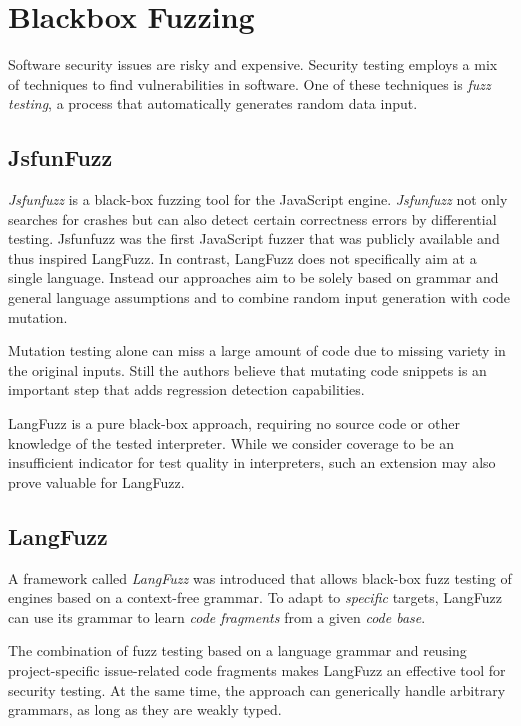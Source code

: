 \section{Blackbox Fuzzing\cite{holler2012fuzzing}} 
Software security issues are risky and expensive. 
Security testing employs a mix of techniques to find vulnerabilities in software. 
One of these techniques is \textit{fuzz testing}, a process that automatically generates random data input.

\subsection{JsfunFuzz}

\textit{Jsfunfuzz} is a black-box fuzzing tool for the JavaScript engine. \textit{Jsfunfuzz} not only searches for crashes but can also detect certain correctness errors by differential testing.
Jsfunfuzz was the first JavaScript fuzzer that was publicly available and thus inspired LangFuzz. In contrast, LangFuzz does not specifically aim at a single language.
Instead our approaches aim to be solely based on grammar and general language assumptions and to combine random input generation with code mutation.

Mutation testing alone can miss a large amount of code due to missing variety in the original inputs.
Still the authors believe that mutating code snippets is an important step that adds regression detection capabilities.

LangFuzz is a pure black-box approach, requiring no source code or other knowledge of the tested interpreter.
While we consider coverage to be an insufficient indicator for test quality in interpreters, such an extension may also prove valuable for LangFuzz.

\subsection{LangFuzz}

A framework called \textit{LangFuzz} was introduced that allows black-box fuzz testing of engines based on a context-free grammar.
To adapt to \textit{specific} targets, LangFuzz can use its grammar to learn \textit{code fragments} from a given \textit{code base}.

The combination of fuzz testing based on a language grammar and reusing project-specific issue-related code fragments makes LangFuzz an effective tool for security testing.
At the same time, the approach can generically handle arbitrary grammars, as long as they are weakly typed.

